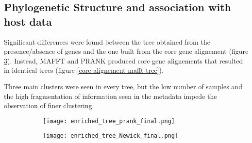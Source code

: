 \subsection*{Phylogenetic Structure and association with host data}
\graphicspath{{images/phylogeneticStructureHostData/}}



Significant differences were found between the tree obtained from the presence/absence of genes
and the one built from the core gene alignement (figure \ref{fig:phylogenetic trees}). Instead,
MAFFT and PRANK produced core gene alignements that resulted in identical trees
(figure \ref{core alignement mafft tree}). 

Three main clusters were seen in every tree, but the low number of samples and the high fragmentation of
information seen in the metadata impede the observation of finer clustering. 


\begin{figure}[h!]
    \centering
    \begin{subfigure}[b]{0.7\textwidth}
        \centering
        \texttt{[image: enriched\_tree\_prank\_final.png]}
        \caption{}
        \label{fig:core alignment prank tree}
    \end{subfigure}
    \begin{subfigure}[b]{0.7\textwidth}
        \centering
        \texttt{[image: enriched\_tree\_Newick\_final.png]}
        \caption{}
        \label{fig:presence absence tree}
    \end{subfigure}
       \caption{}
       \label{fig:phylogenetic trees}
\end{figure}






